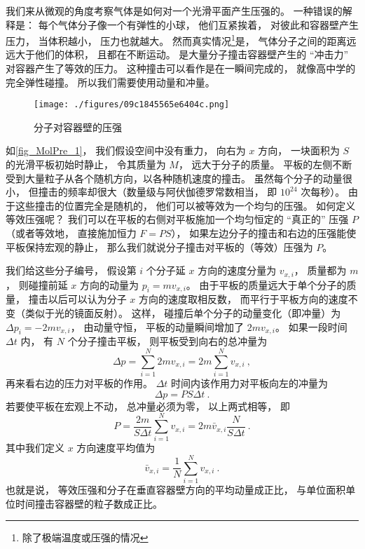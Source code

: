 

我们来从微观的角度考察气体是如何对一个光滑平面产生压强的。 一种错误的解释是： 每个气体分子像一个有弹性的小球， 他们互紧挨着， 对彼此和容器壁产生压力， 当体积越小， 压力也就越大。 然而真实情况\footnote{除了极端温度或压强的情况}是， 气体分子之间的距离远远大于他们的体积， 且都在不断运动。 是大量分子撞击容器壁产生的 “冲击力” 对容器产生了等效的压力。 这种撞击可以看作是在一瞬间完成的， 就像高中学的完全弹性碰撞。 所以我们需要使用动量和冲量。

\begin{figure}[ht]
\centering
\texttt{[image: ./figures/09c1845565e6404c.png]}
\caption{分子对容器壁的压强} \label{fig_MolPre_1}
\end{figure}

如\autoref{fig_MolPre_1}， 我们假设空间中没有重力， 向右为 $x$ 方向， 一块面积为 $S$ 的光滑平板初始时静止， 令其质量为 $M$， 远大于分子的质量。 平板的左侧不断受到大量粒子从各个随机方向，以各种随机速度的撞击。 虽然每个分子的动量很小， 但撞击的频率却很大（数量级与阿伏伽德罗常数相当， 即 $10^{24}$ 次每秒）。 由于这些撞击的位置完全是随机的， 他们可以被等效为一个均匀的压强。 如何定义等效压强呢？ 我们可以在平板的右侧对平板施加一个均匀恒定的 “真正的” 压强 $P$ （或者等效地， 直接施加恒力 $F = PS$）， 如果左边分子的撞击和右边的压强能使平板保持宏观的静止， 那么我们就说分子撞击对平板的（等效）压强为 $P$。

我们给这些分子编号， 假设第 $i$ 个分子延 $x$ 方向的速度分量为 $v_{x,i}$， 质量都为 $m$， 则碰撞前延 $x$ 方向的动量为 $p_i = m v_{x,i}$。 由于平板的质量远大于单个分子的质量， 撞击以后可以认为分子 $x$ 方向的速度取相反数， 而平行于平板方向的速度不变（类似于光的镜面反射）。 这样， 碰撞后单个分子的动量变化（即冲量）为 $\Delta p_i = -2mv_{x,i}$， 由动量守恒， 平板的动量瞬间增加了 $2mv_{x,i}$。 如果一段时间 $\Delta t$ 内， 有 $N$ 个分子撞击平板， 则平板受到向右的总冲量为
\begin{equation}
\Delta p = \sum_{i=1}^N 2mv_{x,i} = 2m \sum_{i=1}^N v_{x,i}~,
\end{equation}
再来看右边的压力对平板的作用。 $\Delta t$ 时间内该作用力对平板向左的冲量为
\begin{equation}\label{eq_MolPre_1}
\Delta p = PS \Delta t~.
\end{equation}
若要使平板在宏观上不动， 总冲量必须为零， 以上两式相等， 即
\begin{equation}
P = \frac{2m}{S\Delta t} \sum_{i=1}^N v_{x,i} = 2m\bar v_{x,i} \frac{N}{S\Delta t}~.
\end{equation}
其中我们定义 $x$ 方向速度平均值为
\begin{equation}\label{eq_MolPre_2}
\bar v_{x,i} = \frac{1}{N}\sum_{i=1}^N v_{x,i}~.
\end{equation}
也就是说， 等效压强和分子在垂直容器壁方向的平均动量成正比， 与单位面积单位时间撞击容器壁的粒子数成正比。

